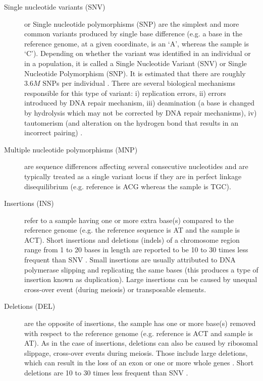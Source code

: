 \begin{description}

	\item[Single nucleotide variants (SNV)] or Single nucleotide polymorphisms (SNP) are the simplest and more common variants produced by single base difference (e.g. a base in the reference genome, at a given coordinate,  is an `A', whereas the sample is `C'). 
	Depending on whether the variant was identified in an individual or in a population, it is called a Single Nucleotide Variant (SNV) or Single Nucleotide Polymorphism (SNP). 
	It is estimated that there are roughly $3.6M$ SNPs per individual \cite{10002012integrated}. 
	There are several biological mechanisms responsible for this type of variant: 
	i) replication errors, 
	ii) errors introduced by DNA repair mechanism, 
	iii) deamination (a base is changed by hydrolysis which may not be corrected by DNA repair mechanisms), 
	iv) tautomerism (and alteration on the hydrogen bond that results in an incorrect pairing) \cite{griffiths2005introduction}.

	\item[Multiple nucleotide polymorphisms (MNP)] are sequence differences affecting several consecutive nucleotides and are typically treated as a single variant locus if they are in perfect linkage disequilibrium (e.g. reference is ACG whereas the sample is TGC).

	\item[Insertions (INS)] refer to a sample having one or more extra base(s) compared to the reference genome (e.g. the reference sequence is AT and the sample is ACT). 
	Short insertions and deletions (indels) of a chromosome region range from 1 to 20 bases in length are reported to be 10 to 30 times less frequent than SNV \cite{10002012integrated}. 
	Small insertions are usually attributed to DNA polymerase slipping and replicating the same bases (this produces a type of insertion known as duplication). 
	Large insertions can be caused by unequal cross-over event (during meiosis) or transposable elements.

	\item[Deletions (DEL)] are the opposite of insertions, the sample has one or more base(s) removed with respect to the reference genome (e.g. reference is ACT and sample is AT). 
	As in the case of insertions, deletions can also be caused by ribosomal slippage, cross-over events during meiosis. 
	Those include large deletions, which can result in the loss of an exon or one or more whole genes \cite{alberts1995molecular}. 
	Short deletions are 10 to 30 times less frequent than SNV \cite{10002012integrated}.


\end{description}
